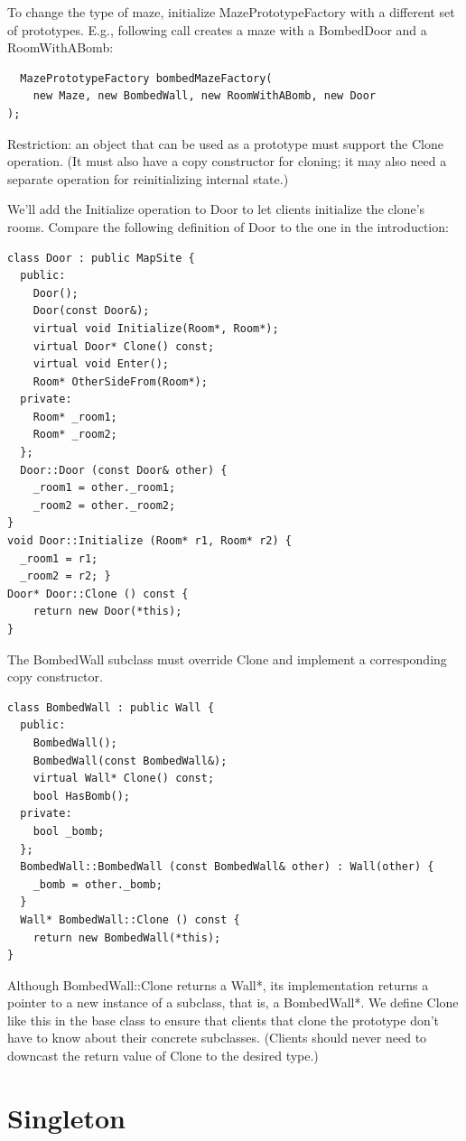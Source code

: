 \documentclass[11pt]{report}
\begin{document}
To change the type of maze, initialize MazePrototypeFactory with a different 
set of prototypes. E.g., following call creates a maze with a BombedDoor and a RoomWithABomb:
\begin{lstlisting}
  MazePrototypeFactory bombedMazeFactory(
    new Maze, new BombedWall, new RoomWithABomb, new Door
);
\end{lstlisting}

Restriction: an object that can be used as a prototype must support the 
Clone operation. (It must also have a copy constructor for cloning; it may also need 
a separate operation for reinitializing internal state.)

We'll add the Initialize operation to Door to let clients initialize the clone's rooms.
Compare the following definition of Door to the one in the introduction:
\begin{lstlisting}
class Door : public MapSite {
  public:
    Door();
    Door(const Door&);
    virtual void Initialize(Room*, Room*);
    virtual Door* Clone() const;
    virtual void Enter();
    Room* OtherSideFrom(Room*);
  private:
    Room* _room1;
    Room* _room2;
  };
  Door::Door (const Door& other) {
    _room1 = other._room1;
    _room2 = other._room2;
}
void Door::Initialize (Room* r1, Room* r2) {
  _room1 = r1;
  _room2 = r2; }
Door* Door::Clone () const {
    return new Door(*this);
}
\end{lstlisting}

The BombedWall subclass must override Clone and implement a corresponding copy constructor.
\begin{lstlisting}
class BombedWall : public Wall {
  public:
    BombedWall();
    BombedWall(const BombedWall&);
    virtual Wall* Clone() const;
    bool HasBomb();
  private:
    bool _bomb;
  };
  BombedWall::BombedWall (const BombedWall& other) : Wall(other) {
    _bomb = other._bomb;
  }
  Wall* BombedWall::Clone () const {
    return new BombedWall(*this);
}
\end{lstlisting}

Although BombedWall::Clone returns a Wall*, its implementation returns a pointer to 
a new instance of a subclass, that is, a BombedWall*. We define Clone like this 
in the base class to ensure that clients that clone the prototype don't have to know 
about their concrete subclasses. (Clients should never 
need to downcast the return value of Clone to the desired type.)

\section{Singleton}
\end{document}

